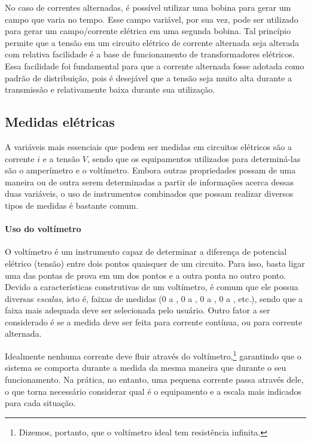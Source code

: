 No caso de correntes alternadas, é possível utilizar uma bobina para gerar um campo que varia no tempo. Esse campo variável, por sua vez, pode ser utilizado para gerar um campo/corrente elétrica em uma segunda bobina. Tal princípio permite que a tensão em um circuito elétrico de corrente alternada seja alterada com relativa facilidade é a base de funcionamento de transformadores elétricos. Essa facilidade foi fundamental para que a corrente alternada fosse adotada como padrão de distribuição, pois é desejável que a tensão seja muito alta durante a transmissão e relativamente baixa durante sua utilização.

\subsection{Medidas elétricas}

A variáveis mais essenciais que podem ser medidas em circuitos elétricos são a corrente $i$ e a tensão $V$, sendo que os equipamentos utilizados para determiná-las são o amperímetro e o voltímetro. Embora outras propriedades possam de uma maneira ou de outra serem determinadas a partir de informações acerca dessas duas variáveis, o uso de instrumentos combinados que possam realizar diversos tipos de medidas é bastante comum.

\paragraph{Uso do voltímetro}

O voltímetro é um instrumento capaz de determinar a diferença de potencial elétrico (tensão) entre dois pontos quaisquer de um circuito. Para isso, basta ligar uma das pontas de prova em um dos pontos e a outra ponta no outro ponto. Devido a características construtivas de um voltímetro, é comum que ele possua diversas \emph{escalas}, isto é, faixas de medidas (0 a , 0 a , 0 a , 0 a , etc.), sendo que a faixa mais adequada deve ser selecionada pelo usuário. Outro fator a ser considerado é se a medida deve ser feita para corrente contínua, ou para corrente alternada.

Idealmente nenhuma corrente deve fluir através do voltímetro,\footnote{Dizemos, portanto, que o voltímetro ideal tem resistência infinita.} garantindo que o sistema se comporta durante a medida da mesma maneira que durante o seu funcionamento. Na prática, no entanto, uma pequena corrente passa através dele, o que torna necessário considerar qual é o equipamento e a escala mais indicados para cada situação.

